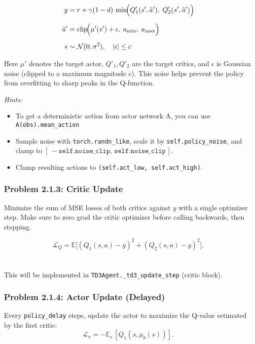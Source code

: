 \documentclass[12pt]{article}
\begin{document}
\begin{equation}
\begin{aligned}
y &= r + \gamma (1-d)\,
      \min\!\Bigl( Q'_1(s', \tilde a'),\; Q'_2(s', \tilde a') \Bigr) \\[6pt]
\tilde a' &= \text{clip}\!\Bigl( \mu'(s') + \epsilon,\; a_{\min},\; a_{\max} \Bigr) \\[6pt]
\epsilon &\sim \mathcal{N}(0,\sigma^2), 
\quad |\epsilon| \le c
\end{aligned}
\end{equation}

Here \(\mu'\) denotes the target actor, \(Q'_1, Q'_2\) are the target critics, and \(\epsilon\) is Gaussian noise (clipped to a maximum magnitude \(c\)). This noise helps prevent the policy from overfitting to sharp peaks in the Q-function.

\noindent\textit{Hints:} 
\begin{itemize}
    \item To get a deterministic action from actor network A, you can use \texttt{A(obs).mean_action}
    \item Sample noise with \texttt{torch.randn\_like}, scale it by \texttt{self.policy\_noise}, and clamp to \([\,-\texttt{self.noise\_clip},\,\texttt{self.noise\_clip}\,]\).
    \item Clamp resulting actions to \texttt{(self.act\_low, self.act\_high)}.
\end{itemize}

\subsubsection*{Problem 2.1.3: Critic Update}
Minimize the sum of MSE losses of both critics against \(y\) with a single optimizer step. Make sure to zero grad the critic optimizer before calling backwards, then stepping. 

\begin{equation}
\mathcal{L}_Q = \mathbb{E}\big[(Q_1(s,a)-y)^2 + (Q_2(s,a)-y)^2\big].
\end{equation}
\\
\\ This will be implemented in \texttt{TD3Agent.\_td3\_update\_step} (critic block).

\subsubsection*{Problem 2.1.4: Actor Update (Delayed)}
Every \texttt{policy\_delay} steps, update the actor to maximize the Q-value estimated by the first critic:
\begin{equation}
\textstyle \mathcal{L}_\pi = -\mathbb{E}_s\,[Q_1(s, \mu_\theta(s))].
\end{equation}
\end{document}
